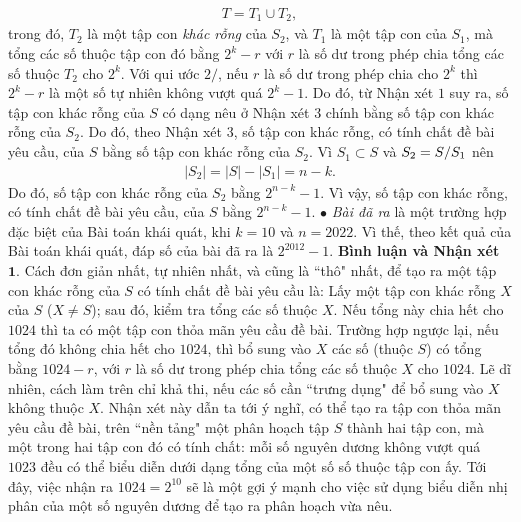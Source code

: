 \begin{multicols}{2}
	\begin{align*}
		T = {T_1} \cup {T_2},
	\end{align*}
	trong đó, $T_2$ là một tập con \textit{khác rỗng} của $S_2$, và $T_1$ là một tập con của  $S_1$, mà tổng các số thuộc tập con đó bằng  $2^k -r$ với $r$ là số dư trong phép chia tổng các số thuộc $T_2$  cho  $2^k$.
	\vskip 0.05cm
	Với qui ước $2/$, nếu $r$ là số dư trong phép chia cho $2^k$  thì $2^k -r$ là một số tự nhiên không vượt quá  $2^k -1$. Do đó, từ Nhận xét $1$ suy ra, số tập con khác rỗng của $S$ có dạng nêu ở Nhận xét $3$ chính bằng số tập con khác rỗng của $S_2$. Do đó, theo Nhận xét $3$, số tập con khác rỗng, có tính chất đề bài yêu cầu, của $S$ bằng số tập con khác rỗng của  $S_2$.
	\vskip 0.05cm
	Vì ${S_1} \subset S$  và  ${S_2} = {S \mathord{\left/
			{\vphantom {S {{S_1}}}} \right.
			\kern-\nulldelimiterspace} {{S_1}}}$ nên
	\begin{align*}
		\left| {{S_2}} \right| = \left| S \right| - \left| {{S_1}} \right| = n - k.
	\end{align*}
	Do đó, số tập con khác rỗng của  $S_2$ bằng  ${2^{n - k}} - 1$.
	\vskip 0.05cm 
	Vì vậy, số tập con khác rỗng, có tính chất đề bài yêu cầu, của $S$ bằng ${2^{n - k}} - 1$.
	\vskip 0.05cm 
	$\bullet$ \textit{Bài đã ra} là một trường hợp đặc biệt của Bài toán khái quát, khi $k = 10$ và $n = 2022$. Vì thế, theo kết quả của Bài toán khái quát, đáp số của bài đã ra là $2^{2012} -1$.
	\vskip 0.05cm 
	\textbf{\color{thachthuctoanhoc}Bình luận và Nhận xét}
	\vskip 0.05cm
	$\pmb{1.}$ Cách đơn giản nhất, tự nhiên nhất, và cũng là ``thô" nhất, để tạo ra một tập con khác rỗng của $S$ có tính chất đề bài yêu cầu là: Lấy một tập con khác rỗng $X$ của $S$ ($X \ne S$); sau đó, kiểm tra tổng các số thuộc $X$. Nếu tổng này chia hết cho $1024$ thì ta có một tập con thỏa mãn yêu cầu đề bài. Trường hợp ngược lại, nếu tổng đó không chia hết cho $1024$, thì bổ sung vào $X$ các số (thuộc $S$) có tổng bằng $1024 - r$, với $r$ là số dư trong phép chia tổng các số thuộc $X$ cho $1024$.
	\vskip 0.05cm
	Lẽ dĩ nhiên, cách làm trên chỉ khả thi, nếu các số cần ``trưng dụng" để bổ sung vào $X$ không thuộc $X$. Nhận xét này dẫn ta tới ý nghĩ, có thể tạo ra tập con thỏa mãn yêu cầu đề bài, trên ``nền tảng" một phân hoạch tập $S$ thành hai tập con, mà một trong hai tập con đó có tính chất: mỗi số nguyên dương không vượt quá $1023$ đều có thể biểu diễn dưới dạng tổng của một số số thuộc tập con ấy. Tới đây, việc nhận ra  $1024 = 2^{10}$ sẽ là một gợi ý mạnh cho việc sử dụng biểu diễn nhị phân của một số nguyên dương để tạo ra phân hoạch vừa nêu.

\end{multicols}
